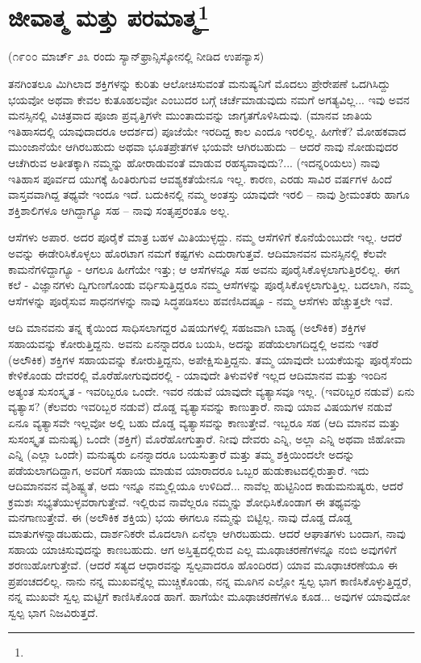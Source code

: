 
\chapter[ಜೀವಾತ್ಮ ಮತ್ತು ಪರಮಾತ್ಮ]{ಜೀವಾತ್ಮ ಮತ್ತು ಪರಮಾತ್ಮ\protect\footnote{}}

\begin{center}
(೧೯೦೦ ಮಾರ್ಚ್ ೨೩ ರಂದು ಸ್ಯಾನ್‌ಫ್ರಾನ್ಸಿಸ್ಕೋನಲ್ಲಿ ನೀಡಿದ ಉಪನ್ಯಾಸ)
\end{center}

ತನಗಿಂತಲೂ ಮಿಗಿಲಾದ ಶಕ್ತಿಗಳನ್ನು ಕುರಿತು ಆಲೋಚಿಸುವಂತೆ ಮನುಷ್ಯನಿಗೆ ಮೊದಲು ಪ್ರೇರೇಪಣೆ ಒದಗಿಸಿದ್ದು ಭಯವೋ ಅಥವಾ ಕೇವಲ ಕುತೂಹಲವೋ ಎಂಬುದರ ಬಗ್ಗೆ ಚರ್ಚೆಮಾಡುವುದು ನಮಗೆ ಅಗತ್ಯವಿಲ್ಲ... ಇವು ಅವನ ಮನಸ್ಸಿನಲ್ಲಿ ವಿಚಿತ್ರವಾದ ಪೂಜಾ ಪ್ರವೃತ್ತಿಗಳೇ ಮುಂತಾದುವನ್ನು ಜಾಗೃತಗೊಳಿಸಿದುವು. (ಮಾನವ ಜಾತಿಯ ಇತಿಹಾಸದಲ್ಲಿ ಯಾವುದಾದರೂ ಆದರ್ಶದ) ಪೂಜೆಯೇ ಇರದಿದ್ದ ಕಾಲ ಎಂದೂ ಇರಲಿಲ್ಲ. ಹೀಗೇಕೆ? ಮೋಹಕವಾದ ಮುಂಜಾನೆಯೇ ಆಗಿರಬಹುದು ಅಥವಾ ಭೂತಪ್ರೇತಗಳ ಭಯವೇ ಆಗಿರಬಹುದು – ಆದರೆ ನಾವು ನೋಡುವುದರ ಆಚೆಗಿರುವ ಅತೀತಕ್ಕಾಗಿ ನಮ್ಮನ್ನು ಹೋರಾಡುವಂತೆ ಮಾಡುವ ರಹಸ್ಯವಾವುದು?... (ಇದನ್ನರಿಯಲು) ನಾವು ಇತಿಹಾಸ ಪೂರ್ವದ ಯುಗಕ್ಕೆ ಹಿಂತಿರುಗುವ ಆವಶ್ಯಕತೆಯೇನೂ ಇಲ್ಲ. ಕಾರಣ, ಎರಡು ಸಾವಿರ ವರ್ಷಗಳ ಹಿಂದೆ ವಾಸ್ತವವಾಗಿದ್ದ ತಥ್ಯವೇ ಇಂದೂ ಇದೆ. ಬದುಕಿನಲ್ಲಿ ನಮ್ಮ ಅಂತಸ್ತು ಯಾವುದೇ ಇರಲಿ – ನಾವು ಶ‍್ರೀಮಂತರು ಹಾಗೂ ಶಕ್ತಿಶಾಲಿಗಳೂ ಆಗಿದ್ದಾಗ್ಯೂ ಸಹ – ನಾವು ಸಂತೃಪ್ತರಂತೂ ಅಲ್ಲ.

ಆಸೆಗಳು ಅಪಾರ. ಅದರ ಪೂರೈಕೆ ಮಾತ್ರ ಬಹಳ ಮಿತಿಯುಳ್ಳದ್ದು. ನಮ್ಮ ಆಸೆಗಳಿಗೆ ಕೊನೆಯೆಂಬುದೇ ಇಲ್ಲ. ಆದರೆ ಅವನ್ನು ಈಡೇರಿಸಿಕೊಳ್ಳಲು ಹೊರಟಾಗ ನಮಗೆ ಕಷ್ಟಗಳು ಎದುರಾಗುತ್ತವೆ. ಆದಿಮಾನವನ ಮನಸ್ಸಿನಲ್ಲಿ ಕೆಲವೇ ಕಾಮನೆಗಳಿದ್ದಾಗ್ಯೂ - ಆಗಲೂ ಹೀಗೆಯೇ ಇತ್ತು; ಆ ಆಸೆಗಳನ್ನೂ ಸಹ ಅವನು ಪೂರೈಸಿಕೊಳ್ಳಲಾಗುತ್ತಿರಲಿಲ್ಲ. ಈಗ ಕಲೆ - ವಿಜ್ಞಾನಗಳು ದ್ವಿಗುಣಗೊಂಡು ವರ್ಧಿಸುತ್ತಿದ್ದರೂ ನಮ್ಮ ಆಸೆಗಳನ್ನು ಪೂರೈಸಿಕೊಳ್ಳಲಾಗುತ್ತಿಲ್ಲ. ಬದಲಾಗಿ, ನಮ್ಮ ಆಸೆಗಳನ್ನು ಪೂರೈಸುವ ಸಾಧನಗಳನ್ನು ನಾವು ಸಿದ್ಧಪಡಿಸಲು ಹವಣಿಸಿದಷ್ಟೂ - ನಮ್ಮ ಆಸೆಗಳು ಹೆಚ್ಚುತ್ತಲೇ ಇವೆ.

ಆದಿ ಮಾನವನು ತನ್ನ ಕೈಯಿಂದ ಸಾಧಿಸಲಾಗದ್ದರ ವಿಷಯಗಳಲ್ಲಿ ಸಹಜವಾಗಿ ಬಾಹ್ಯ (ಅಲೌಕಿಕ) ಶಕ್ತಿಗಳ ಸಹಾಯವನ್ನು ಕೋರುತ್ತಿದ್ದನು. ಅವನು ಏನನ್ನಾದರೂ ಬಯಸಿ, ಅದನ್ನು ಪಡೆಯಲಾಗದಿದ್ದಲ್ಲಿ ಅವನು ಇತರೆ (ಅಲೌಕಿಕ) ಶಕ್ತಿಗಳ ಸಹಾಯವನ್ನು ಕೋರುತ್ತಿದ್ದನು, ಅಪೇಕ್ಷಿಸುತ್ತಿದ್ದನು. ತಮ್ಮ ಯಾವುದೇ ಬಯಕೆಯನ್ನು ಪೂರೈಸೆಂದು ಕೇಳಿಕೊಂಡು ದೇವರಲ್ಲಿ ಮೊರೆಹೋಗುವುದರಲ್ಲಿ - ಯಾವುದೇ ತಿಳುವಳಿಕೆ ಇಲ್ಲದ ಆದಿಮಾನವ ಮತ್ತು ಇಂದಿನ ಅತ್ಯಂತ ಸುಸಂಸ್ಕೃತ - ಇವರಿಬ್ಬರೂ ಒಂದೇ. ಇವರ ನಡುವೆ ಯಾವುದೇ ವ್ಯತ್ಯಾಸವೂ ಇಲ್ಲ. (ಇವರಿಬ್ಬರ ನಡುವೆ) ಏನು ವ್ಯತ್ಯಾಸ? (ಕೆಲವರು ಇವರಿಬ್ಬರ ನಡುವೆ) ದೊಡ್ಡ ವ್ಯತ್ಯಾಸವನ್ನು ಕಾಣುತ್ತಾರೆ. ನಾವು ಯಾವ ವಿಷಯಗಳ ನಡುವೆ ಏನೂ ವ್ಯತ್ಯಾಸವೇ ಇಲ್ಲವೋ ಅಲ್ಲಿ ಬಹು ದೊಡ್ಡ ವ್ಯತ್ಯಾಸವನ್ನು ಕಾಣುತ್ತೇವೆ. ಇಬ್ಬರೂ ಸಹ (ಆದಿ ಮಾನವ ಮತ್ತು ಸುಸಂಸ್ಕೃತ ಮನುಷ್ಯ) ಒಂದೇ (ಶಕ್ತಿಗೆ) ಮೊರೆಹೋಗುತ್ತಾರೆ. ನೀವು ದೇವರು ಎನ್ನಿ, ಅಲ್ಲಾ ಎನ್ನಿ ಅಥವಾ ಜಿಹೋವಾ ಎನ್ನಿ (ಎಲ್ಲಾ ಒಂದೇ) ಮನುಷ್ಯರು ಏನನ್ನಾದರೂ ಬಯಸುತ್ತಾರೆ ಮತ್ತು ತಮ್ಮ ಶಕ್ತಿಯಿಂದಲೇ ಅದನ್ನು ಪಡೆಯಲಾಗದಿದ್ದಾಗ, ಅವರಿಗೆ ಸಹಾಯ ಮಾಡುವ ಯಾರಾದರೂ ಒಬ್ಬರ ಹುಡುಕಾಟದಲ್ಲಿರುತ್ತಾರೆ. ಇದು ಆದಿಮಾನವನ ವೈಶಿಷ್ಟ್ಯತೆ, ಅದು ಇನ್ನೂ ನಮ್ಮಲ್ಲಿಯೂ ಉಳಿದಿದೆ... ನಾವೆಲ್ಲ ಹುಟ್ಟಿನಿಂದ ಕಾಡುಮನುಷ್ಯರು, ಆದರೆ ಕ್ರಮಶಃ ಸಭ್ಯತೆಯುಳ್ಳವರಾಗುತ್ತೇವೆ. ಇಲ್ಲಿರುವ ನಾವೆಲ್ಲರೂ ನಮ್ಮನ್ನು ಶೋಧಿಸಿಕೊಂಡಾಗ ಈ ತಥ್ಯವನ್ನು ಮನಗಾಣುತ್ತೇವೆ. ಈ (ಅಲೌಕಿಕ ಶಕ್ತಿಯ) ಭಯ ಈಗಲೂ ನಮ್ಮನ್ನು ಬಿಟ್ಟಿಲ್ಲ. ನಾವು ದೊಡ್ಡ ದೊಡ್ಡ ಮಾತುಗಳನ್ನಾಡಬಹುದು, ದಾರ್ಶನಿಕರೇ ಮೊದಲಾಗಿ ಏನೆಲ್ಲಾ ಆಗಿರಬಹುದು. ಆದರೆ ಆಘಾತಗಳು ಬಂದಾಗ, ನಾವು ಸಹಾಯ ಯಾಚಿಸುವುದನ್ನು ಕಾಣಬಹುದು. ಆಗ ಅಸ್ತಿತ್ವದಲ್ಲಿರುವ ಎಲ್ಲ ಮೂಢಾಚರಣೆಗಳನ್ನೂ ನಂಬಿ ಅವುಗಳಿಗೆ ಶರಣುಹೋಗುತ್ತೇವೆ. (ಆದರೆ ಸತ್ಯದ ಆಧಾರವನ್ನು ಸ್ವಲ್ಪವಾದರೂ ಹೊಂದಿರದ) ಯಾವ ಮೂಢಾಚರಣೆಯೂ ಈ ಪ್ರಪಂಚದಲಿಲ್ಲ. ನಾನು ನನ್ನ ಮುಖವನ್ನೆಲ್ಲ ಮುಚ್ಚಿಕೊಂಡು, ನನ್ನ ಮೂಗಿನ ಎಲ್ಲೋ ಸ್ವಲ್ಪ ಭಾಗ ಕಾಣಿಸಿಕೊಳ್ಳುತ್ತಿದ್ದರೆ, ನನ್ನ ಮುಖವೇ ಸ್ವಲ್ಪ ಮಟ್ಟಿಗೆ ಕಾಣಿಸಿಕೊಂಡ ಹಾಗೆ. ಹಾಗೆಯೇ ಮೂಢಾಚರಣೆಗಳೂ ಕೂಡ... ಅವುಗಳ ಯಾವುದೋ ಸ್ವಲ್ಪ ಭಾಗ ನಿಜವಿರುತ್ತದೆ.

